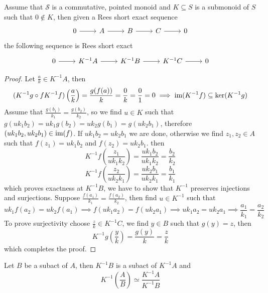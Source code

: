 \begin{proposition}
    Assume that $\mathcal{S}$ is a commutative, pointed monoid and $K\subseteq S$ is a submonoid of $S$ such that $0\not\in K$, then
    given a Rees short exact sequence 
    \[\begin{tikzcd}
        0 & A & B & C & 0
        \arrow[from=1-1, to=1-2]
        \arrow[from=1-2, to=1-3]
        \arrow[from=1-3, to=1-4]
        \arrow[from=1-4, to=1-5]
    \end{tikzcd}\]
    the following sequence is Rees short exact
    \[\begin{tikzcd}
        0 & {K^{-1}A} & {K^{-1}B} & {K^{-1}C} & 0
        \arrow[from=1-1, to=1-2]
        \arrow[from=1-2, to=1-3]
        \arrow[from=1-3, to=1-4]
        \arrow[from=1-4, to=1-5]
    \end{tikzcd}\]
\end{proposition}
\begin{proof}[Proof]
    Let $\frac{a}{k}\in K^{-1}A$, then 
    \[
    (K^{-1}g\circ fK^{-1}f)\left(\frac{a}{k}\right) = \frac{g(f(a))}{k} = \frac{0}{k} =\frac{0}{1}=0 \implies \text{im}(K^{-1}f)\subseteq\ker(K^{-1}g)
    \]
    Assume that $\frac{g(b_1)}{k_1}=\frac{g(b_2)}{k_2}$, so we find $u\in K$ such that 
    $g(uk_1b_2)=uk_1g(b_2)=uk_2g(b_1)=g(uk_2b_1)$, therefore 
    $(uk_1b_2,uk_2b_1)\in\text{im}(f)$. If $uk_1b_2=uk_2b_1$ we are done, otherwise 
    we find $z_1,z_2\in A$ such that $f(z_1) = uk_1b_2$ and $f(z_2)=uk_2b_1$.
    then 
    \[
        K^{-1}f\left(\frac{z_1}{uk_1k_2}\right) = \frac{uk_1b_2}{uk_1k_2} = \frac{b_2}{k_2}
    \] 
    \[
        K^{-1}f\left(\frac{z_2}{uk_2k_1}\right) = \frac{uk_2b_1}{uk_2k_1} = \frac{b_1}{k_1}
    \]
    which proves exactness at $K^{-1}B$, we have to show that $K^{-1}$ preserves injections and surjections.
    Suppose $\frac{f(a_1)}{k_1}=\frac{f(a_2)}{k_2}$, then find $u\in K^{-1}$ such that 
    \[
    uk_1f(a_2) = uk_2f(a_1)\implies f(uk_1a_2)=f(uk_2a_1) \implies uk_1a_2=uk_2a_1 \implies\frac{a_1}{k_1}=\frac{a_2}{k_2}
    \]
    To prove surjectivity choose $\frac{z}{k}\in K^{-1}C$, we find $y\in B$ such that $g(y)=z$, then 
    \[
        K^{-1}g\left(\frac{y}{k}\right) = \frac{g(y)}{k} = \frac{z}{k}
    \]
    which completes the proof.
\end{proof}
\begin{corollary}
    Let $B$ be a subact of $A$, then $K^{-1}B$ is a subact of $K^{-1}A$ and  
    \[
        K^{-1}\left(\frac{A}{B}\right) \simeq \frac{K^{-1}A}{K^{-1}B}
    \]
\end{corollary}
